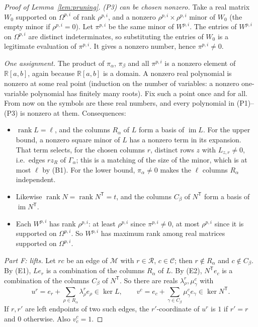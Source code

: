\documentclass[11pt]{article}
\theoremstyle{remark}
\DeclareMathOperator{\rank}{rank}
\DeclareMathOperator{\im}{im}
\newcommand{\R}{\mathbb R}
\begin{document}
\begin{proof}[Proof of Lemma~\ref{lem:pruning}]
\emph{(P3) can be chosen nonzero.}  Take a real matrix $W_0$ supported on
$\Omega^{p,i}$ of rank $\rho^{p,i}$, and a nonzero
$\rho^{p,i}\times\rho^{p,i}$ minor of $W_0$ (the empty minor if
$\rho^{p,i}=0$).  Let $\pi^{p,i}$ be the same minor of $W^{p,i}$.  The
entries of $W^{p,i}$ on $\Omega^{p,i}$ are distinct indeterminates, so
substituting the entries of $W_0$ is a legitimate evaluation of
$\pi^{p,i}$.  It gives a nonzero number, hence $\pi^{p,i}\ne0$.

\emph{One assignment.}  The product of $\pi_\alpha$, $\pi_\beta$ and all
$\pi^{p,i}$ is a nonzero element of $\R[a,b]$, again because $\R[a,b]$ is a
domain.  A nonzero real polynomial is nonzero at some real point (induction
on the number of variables: a nonzero one-variable polynomial has finitely
many roots).  Fix such a point once and for all.  From now on the symbols
are these real numbers, and every polynomial in (P1)--(P3) is nonzero at
them.  Consequences:
\begin{itemize}[leftmargin=*]
\item[(E1)] $\rank L=\ell$, and the columns $R_\alpha$ of $L$ form a basis
of $\im L$.  For the upper bound, a nonzero square minor of $L$ has a
nonzero term in its expansion.  That term selects, for the chosen columns
$r$, distinct rows $z$ with $L_{z,r}\ne0$, i.e.\ edges $rz_R$ of
$\Gamma_\alpha$; this is a matching of the size of the minor, which is at
most $\ell$ by (B1).  For the lower bound, $\pi_\alpha\ne0$ makes the $\ell$
columns $R_\alpha$ independent.
\item[(E2)] Likewise $\rank N=\rank N^{\mathsf T}=t$, and the columns
$C_\beta$ of $N^{\mathsf T}$ form a basis of $\im N^{\mathsf T}$.
\item[(E3)] Each $W^{p,i}$ has rank $\rho^{p,i}$: at least $\rho^{p,i}$
since $\pi^{p,i}\ne0$, at most $\rho^{p,i}$ since it is supported on
$\Omega^{p,i}$.  So $W^{p,i}$ has maximum rank among real matrices supported
on $\Omega^{p,i}$.
\end{itemize}

\medskip\noindent
\emph{Part F: lifts.}
Let $rc$ be an edge of $\mathcal M$ with $r\in\mathcal R$, $c\in\mathcal C$;
then $r\notin R_\alpha$ and $c\notin C_\beta$.  By (E1), $Le_r$ is a
combination of the columns $R_\alpha$ of $L$.  By (E2), $N^{\mathsf T}e_c$
is a combination of the columns $C_\beta$ of $N^{\mathsf T}$.  So there are
reals $\lambda^r_\rho,\mu^c_\gamma$ with
\begin{equation}\label{eq:pruning-lifts}
 u^r=e_r+\sum_{\rho\in R_\alpha}\lambda_\rho^r e_\rho\in\ker L,
 \qquad
 v^c=e_c+\sum_{\gamma\in C_\beta}\mu_\gamma^c e_\gamma
                 \in\ker N^{\mathsf T}.
\end{equation}
If $r,r'$ are left endpoints of two such edges, the $r'$-coordinate of $u^r$
is $1$ if $r'=r$ and $0$ otherwise.  Also $v^c_c=1$.


\end{proof}
\end{document}
